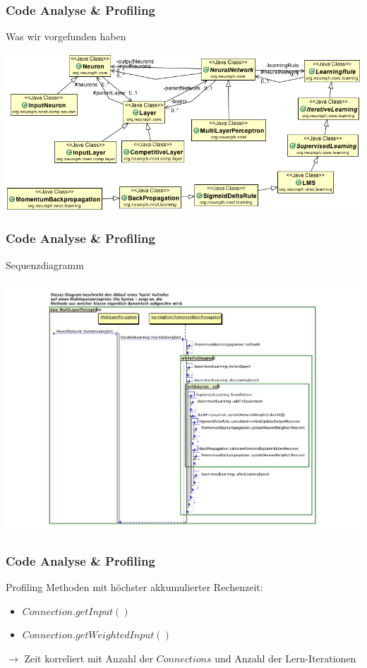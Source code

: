 \documentclass[18pt]{beamer}
\begin{document}
	\begin{frame}[c]\frametitle{Code Analyse \& Profiling}
		\begin{block}{Was wir vorgefunden haben}
			\begin{center}
				\includegraphics[scale=0.4]{images/Klassendiagramm.png}
			\end{center}
		\end{block}
	\end{frame}
	
	\begin{frame}[c]\frametitle{Code Analyse \& Profiling}
		\begin{block}{Sequenzdiagramm}
			\begin{center}
			  \includegraphics[scale=0.3]{images/Learn.pdf} 
			\end{center}
		\end{block}
	\end {frame}
	
	\begin{frame}[c]\frametitle{Code Analyse \& Profiling}
		\begin{block}{Profiling}
			Methoden mit höchster akkumulierter Rechenzeit:
			\begin{itemize}
				\item $Connection.getInput()$
				\item $Connection.getWeightedInput()$
		    \end{itemize}
			$\rightarrow$ Zeit korreliert mit Anzahl der $Connections$ und Anzahl der Lern-Iterationen
		\end{block}
	\end {frame}			
	
\end{document}
